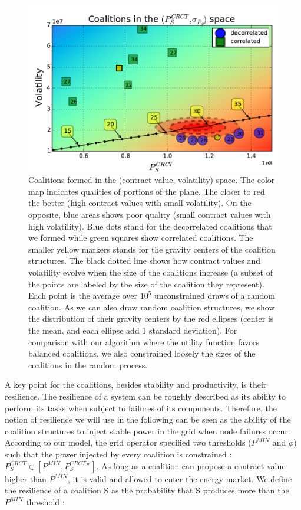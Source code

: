 \documentclass[conference]{IEEEtran}
\begin{document}
\begin{figure}
\includegraphics[scale=.6]{./figures/coalitions/coalitions6}
\caption{Coalitions formed in the (contract value, volatility) space. The color map indicates qualities of portions of the plane. The closer to red the better (high contract values with small volatility). On the opposite, blue areas shows poor quality (small contract values with high volatility). Blue dots stand for the decorrelated coalitions that we formed while green squares show correlated coalitions. The smaller yellow markers stands for the gravity centers of the coalition structures. The black dotted line shows how contract values and volatility evolve  when the size of the coalitions increase (a subset of the points are labeled by the size of the coalition they represent). Each point is the average over $ 10^{5} $ unconstrained draws of a random coalition. As we can also draw random coalition structures, we show the distribution of their gravity centers by the red ellipses (center is the mean, and each ellipse add 1 standard deviation). For comparison with our algorithm where the utility function favors balanced coalitions, we also constrained loosely the sizes of the coalitions in the random process. }
\label{fig:coalitions}
\end{figure}

A key point for the coalitions, besides stability and productivity, is their resilience. The resilience of a system can be roughly described as its ability to perform its tasks when subject to failures of its components. Therefore, the notion of resilience we will use in the following can be seen as the ability of the coalition structures to inject stable power in the grid when node failures occur. According to our model, the grid operator specified two thresholds ($P^{MIN}$ and $ \phi $) such that the power injected by every coalition is constrained : $ P_{S}^{CRCT} \in [P^{MIN}, P_{S}^{CRCT \star}] $. As long as a coalition can propose a contract value higher than $ P^{MIN} $, it is valid and allowed to enter the energy market. We define the resilience of a coalition S as the probability that S produces more than the $ P^{MIN} $ threshold :
\end{document}
